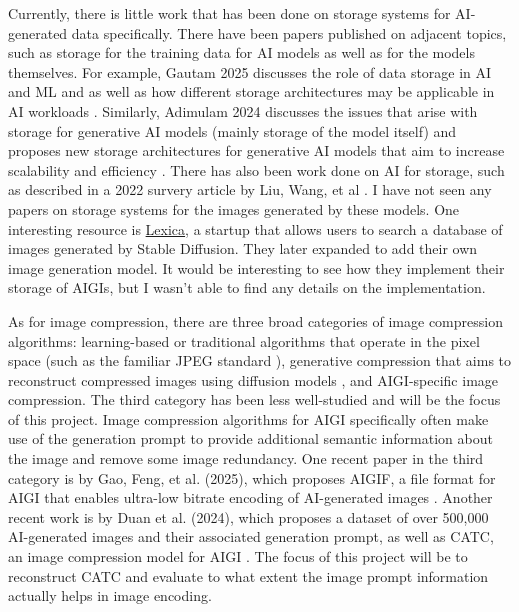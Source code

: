 Currently, there is little work that has been done on storage systems for AI-generated data specifically. There have been papers published on adjacent topics, such as storage for the training data for AI models as well as for the models themselves. For example, Gautam 2025 discusses the role of data storage in AI and ML and as well as how different storage architectures may be applicable in AI workloads \cite{gautam_optimizing_2025}. Similarly, Adimulam 2024 discusses the issues that arise with storage for generative AI models (mainly storage of the model itself) and proposes new storage architectures for generative AI models that aim to increase scalability and efficiency \cite{adimulam_ai-optimized_2024}. There has also been work done on AI for storage, such as described in a 2022 survery article by Liu, Wang, et al \cite{liu_survey_2022}. I have not seen any papers on storage systems for the images generated by these models. One interesting resource is \href{https://lexica.art/}{Lexica}, a startup that allows users to search a database of images generated by Stable Diffusion. They later expanded to add their own image generation model. It would be interesting to see how they implement their storage of AIGIs, but I wasn’t able to find any details on the implementation.  \par
As for image compression, there are three broad categories of image compression algorithms: learning-based or traditional algorithms that operate in the pixel space (such as the familiar JPEG standard \cite{wallace_jpeg_1992}), generative compression that aims to reconstruct compressed images using diffusion models \cite{santurkar_generative_2017}, and AIGI-specific image compression. The third category has been less well-studied and will be the focus of this project. Image compression algorithms for AIGI specifically often make use of the generation prompt to provide additional semantic information about the image and remove some image redundancy. One recent paper in the third category is by Gao, Feng, et al. (2025), which proposes AIGIF, a file format for AIGI that enables ultra-low bitrate encoding of AI-generated images \cite{gao_towards_nodate}. Another recent work is by Duan et al. (2024), which proposes a dataset of over 500,000 AI-generated images and their associated generation prompt, as well as CATC, an image compression model for AIGI \cite{duan2024PKU-AIGI-500K}. The focus of this project will be to reconstruct CATC and evaluate to what extent the image prompt information actually helps in image encoding. 
